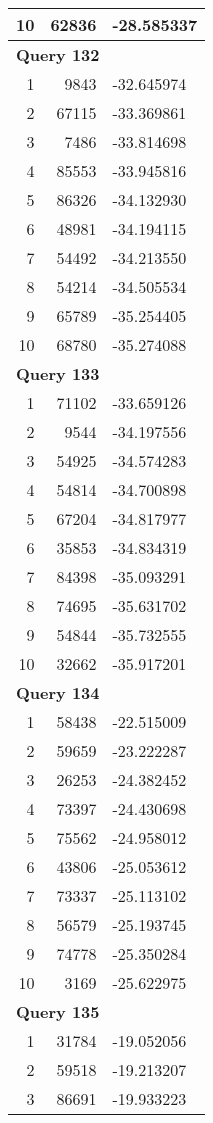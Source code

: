\begin{longtable}[{p}]{@{}rrp{}@{}}
10 & 62836 & -28.585337 \\
\midrule
\multicolumn{3}{l}{\bfseries Query 132} \\
1 & 9843 & -32.645974 \\
2 & 67115 & -33.369861 \\
3 & 7486 & -33.814698 \\
4 & 85553 & -33.945816 \\
5 & 86326 & -34.132930 \\
6 & 48981 & -34.194115 \\
7 & 54492 & -34.213550 \\
8 & 54214 & -34.505534 \\
9 & 65789 & -35.254405 \\
10 & 68780 & -35.274088 \\
\midrule
\multicolumn{3}{l}{\bfseries Query 133} \\
1 & 71102 & -33.659126 \\
2 & 9544 & -34.197556 \\
3 & 54925 & -34.574283 \\
4 & 54814 & -34.700898 \\
5 & 67204 & -34.817977 \\
6 & 35853 & -34.834319 \\
7 & 84398 & -35.093291 \\
8 & 74695 & -35.631702 \\
9 & 54844 & -35.732555 \\
10 & 32662 & -35.917201 \\
\midrule
\multicolumn{3}{l}{\bfseries Query 134} \\
1 & 58438 & -22.515009 \\
2 & 59659 & -23.222287 \\
3 & 26253 & -24.382452 \\
4 & 73397 & -24.430698 \\
5 & 75562 & -24.958012 \\
6 & 43806 & -25.053612 \\
7 & 73337 & -25.113102 \\
8 & 56579 & -25.193745 \\
9 & 74778 & -25.350284 \\
10 & 3169 & -25.622975 \\
\midrule
\multicolumn{3}{l}{\bfseries Query 135} \\
1 & 31784 & -19.052056 \\
2 & 59518 & -19.213207 \\
3 & 86691 & -19.933223 \\

\end{longtable}
